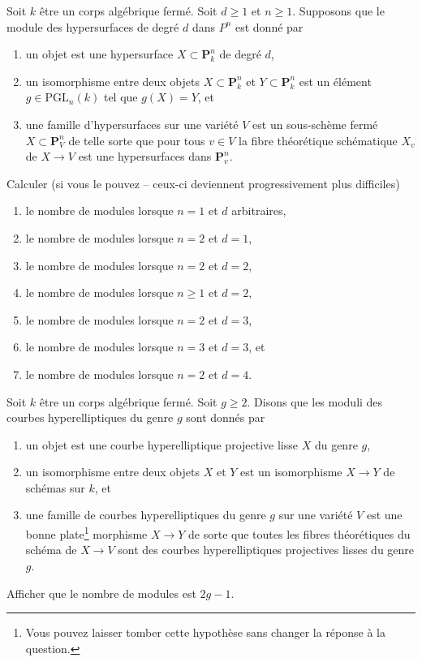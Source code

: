\begin{exercise}
\label{exercise-number-moduli-lines-conics}
Soit $k$ être un corps algébrique fermé. Soit $d \geq 1$ et $n \geq
1$. Supposons que le module des hypersurfaces de degré $d$ dans $P^n$ est donné par
\begin{enumerate}
\item un objet est une hypersurface $X \subset \mathbf{P}^n_k$ de
degré $d$,
\item un isomorphisme entre deux objets $X \subset \mathbf{P}^n_k$ et
$Y \subset \mathbf{P}^n_k$ est un élément $g \in \text{PGL}_n(k)$ tel que
$g(X) = Y$, et
\item une famille d'hypersurfaces sur une variété $V$ est un sous-schème
fermé $X \subset \mathbf{P}^n_V$ de telle sorte que pour tous $v \in
V$ la fibre théorétique schématique $X_v$ de $X
\to V$ est une hypersurfaces dans $\mathbf{P}^n_v$.
\end{enumerate}
Calculer (si vous le pouvez -- ceux-ci deviennent progressivement plus difficiles)
\begin{enumerate}
\item le nombre de modules lorsque $n = 1$ et $d$ arbitraires,
\item le nombre de modules lorsque $n = 2$ et $d = 1$,
\item le nombre de modules lorsque $n = 2$ et $d = 2$,
\item le nombre de modules lorsque $n \geq 1$ et $d = 2$,
\item le nombre de modules lorsque $n = 2$ et $d = 3$,
\item le nombre de modules lorsque $n = 3$ et $d = 3$, et
\item le nombre de modules lorsque $n = 2$ et $d = 4$.
\end{enumerate}
\end{exercise}

\begin{exercise}
\label{exercise-number-moduli-hyperelliptic}
Soit $k$ être un corps algébrique fermé. Soit $g \geq 2$.
Disons que les moduli des courbes hyperelliptiques du genre $g$ sont donnés par
\begin{enumerate}
\item un objet est une courbe hyperelliptique projective lisse $X$ du
genre $g$,
\item un isomorphisme entre deux objets $X$ et $Y$ est un
isomorphisme $X \to Y$ de schémas sur $k$, et
\item une famille de courbes hyperelliptiques du genre $g$ sur une variété $V$ est
une bonne plate\footnote{Vous pouvez laisser tomber cette hypothèse sans changer la réponse
à la question.} morphisme $X \to Y$ de sorte que toutes les fibres
théorétiques du schéma de $X \to V$ sont des courbes hyperelliptiques projectives lisses du
genre $g$.
\end{enumerate}
Afficher que le nombre de modules est $2g - 1$.
\end{exercise}





